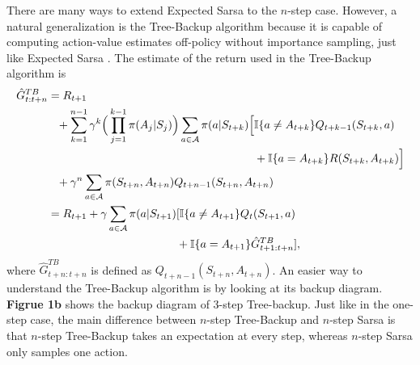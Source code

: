 There are many ways to extend Expected Sarsa to the $n$-step case.
However, a natural generalization is the Tree-Backup algorithm because it is capable of computing action-value estimates off-policy without importance sampling, just like Expected Sarsa \parencite{precup2000}. 
The estimate of the return used in the Tree-Backup algorithm is
%
\begin{align}
\label{eq:treebackup_return}
\hat{G}^{TB}_{t:t+n} &= R_{t+1} 
	\nonumber \\
& \hphantom{=} 
	+ \sum^{n-1}_{k=1} \gamma^k \Big( \prod^{k-1}_{j=1} \pi(A_{j}|S_{j}) \Big)
	\sum_{a \in \mathcal{A}} \pi(a|S_{t+k}) 
	\Big[ \mathbb{I}\{ a \neq A_{t+k} \} Q_{t+k-1}(S_{t+k}, a) 
    \nonumber \\
& \hphantom{= + \sum^{n-1}_{k=1} \gamma^k \Big( \prod^{k-1}_{j=1} \pi(A_{j}|S_{j}) \Big) 
			\sum_{a \in \mathcal{A}} \pi(a|S_{t+k}) 
			\Big[} 
	+ \mathbb{I}\{ a = A_{t+k} \} R(S_{t+k}, A_{t+k})\Big]
	\nonumber \\
& \hphantom{=} 
	+ \gamma^n \sum_{a \in \mathcal{A}} \pi(S_{t+n}, A_{t+n}) Q_{t+n-1}(S_{t+n}, A_{t+n})
	\nonumber \\
%
&= R_{t+1} + \gamma \sum_{a \in \mathcal{A}} \pi(a|S_{t+1}) 
	[\mathbb{I}\{a \neq A_{t+1}\} Q_t(S_{t+1},a) \nonumber \\
& \hphantom{= R_{t+1} + \gamma \sum_{a \in \mathcal{A}} \pi(a|S_{t+1}) [}
	+ \mathbb{I}\{a = A_{t+1}\} \hat{G}^{TB}_{t+1:t+n}],
\end{align}
where $\hat{G}^{TB}_{t+n:t+n}$ is defined as $Q_{t+n-1}(S_{t+n}, A_{t+n})$.
An easier way to understand the Tree-Backup algorithm is by looking at its backup diagram.
\textbf{Figrue 1b} shows the backup diagram of 3-step Tree-backup.
Just like in the one-step case, the main difference between $n$-step Tree-Backup and $n$-step Sarsa is that $n$-step Tree-Backup takes an expectation at every step, whereas $n$-step Sarsa only samples one action.


